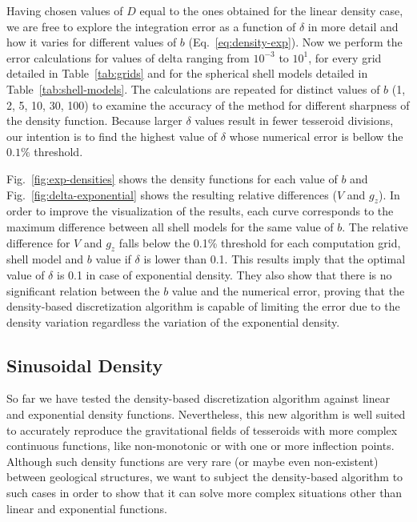 \documentclass[extra, referee]{gji}
\begin{document}
Having chosen values of $D$ equal to the ones obtained for the linear density case, we
are free to explore the integration error as a function of $\delta$ in more detail and
how it varies for different values of $b$ (Eq.~\ref{eq:density-exp}).
Now we perform the error calculations for values of delta ranging from $10^{-3}$ to
$10^{1}$, for every grid detailed in Table~\ref{tab:grids} and for the spherical shell
models detailed in Table~\ref{tab:shell-models}.
The calculations are repeated for distinct values of $b$ (1, 2, 5, 10, 30, 100) to
examine the accuracy of the method for different sharpness of the density function.
Because larger $\delta$ values result in fewer tesseroid divisions,
our intention is to find the highest value of $\delta$ whose numerical error is bellow
the $0.1\%$ threshold.

Fig.~\ref{fig:exp-densities} shows the density functions for each value of $b$ and
Fig.~\ref{fig:delta-exponential} shows the resulting relative
differences ($V$ and $g_z$).
In order to improve the visualization of the results, each curve corresponds to the
maximum difference between all shell models for the same value of $b$.
The relative difference for $V$ and $g_z$ falls below the 0.1\% threshold
for each computation grid, shell model and $b$ value if $\delta$ is lower than 0.1.
This results imply that the optimal value of $\delta$ is 0.1 in case of exponential
density.
They also show that there is no significant relation between the $b$ value and the
numerical error, proving that the density-based discretization algorithm is capable of
limiting the error due to the density variation regardless the variation of the
exponential density.


\subsection{Sinusoidal Density}

So far we have tested the density-based discretization algorithm against linear and
exponential density functions.
Nevertheless, this new algorithm is well suited to accurately reproduce the
gravitational fields of tesseroids with more complex continuous functions, like
non-monotonic or with one or more inflection points.
Although such density functions are very rare (or maybe even non-existent) between
geological structures, we want to subject the density-based algorithm to such cases in
order to show that it can solve more complex situations other than linear and
exponential functions.
\end{document}
